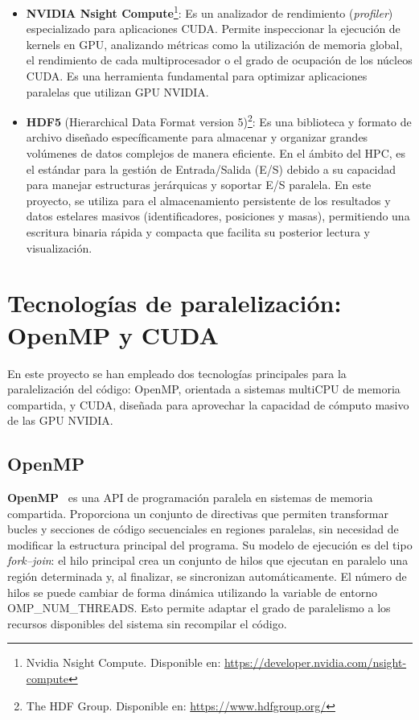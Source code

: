 \begin{itemize}
    \item \textbf{NVIDIA Nsight Compute}\footnote{Nvidia Nsight Compute. Disponible en: \url{https://developer.nvidia.com/nsight-compute}}:
    Es un analizador de rendimiento (\textit{profiler}) especializado para aplicaciones CUDA.
    Permite inspeccionar la ejecución de kernels en GPU, analizando métricas como la utilización de memoria global, el rendimiento de cada multiprocesador o el grado de ocupación de los núcleos CUDA.
    Es una herramienta fundamental para optimizar aplicaciones paralelas que utilizan GPU NVIDIA.

    \item \textbf{HDF5} (Hierarchical Data Format version 5)\footnote{The HDF Group. Disponible en: \url{https://www.hdfgroup.org/}}:
    Es una biblioteca y formato de archivo diseñado específicamente para almacenar y organizar grandes volúmenes de datos complejos de manera eficiente.
    En el ámbito del HPC, es el estándar para la gestión de Entrada/Salida (E/S) debido a su capacidad para manejar estructuras jerárquicas y soportar E/S paralela.
    En este proyecto, se utiliza para el almacenamiento persistente de los resultados y datos estelares masivos (identificadores, posiciones y masas), permitiendo una escritura binaria rápida y compacta que facilita su posterior lectura y visualización.
\end{itemize}

\section{Tecnologías de paralelización: OpenMP y CUDA}\label{sec:openmp-cuda}
En este proyecto se han empleado dos tecnologías principales para la paralelización del código: OpenMP, orientada a sistemas multiCPU de memoria compartida, y CUDA, diseñada para aprovechar la capacidad de cómputo masivo de las GPU NVIDIA\@.

\subsection{OpenMP}\label{subsec:openmp}

\textbf{OpenMP}~\cite{openmp-spec} es una API de programación paralela en sistemas de memoria compartida.
Proporciona un conjunto de directivas que permiten transformar bucles y secciones de código secuenciales en regiones paralelas, sin necesidad de modificar la estructura principal del programa.
Su modelo de ejecución es del tipo \textit{fork–join}: el hilo principal crea un conjunto de hilos que ejecutan en paralelo una región determinada y, al finalizar, se sincronizan automáticamente.
El número de hilos se puede cambiar de forma dinámica utilizando la variable de entorno OMP\_NUM\_THREADS.
Esto permite adaptar el grado de paralelismo a los recursos disponibles del sistema sin recompilar el código.


